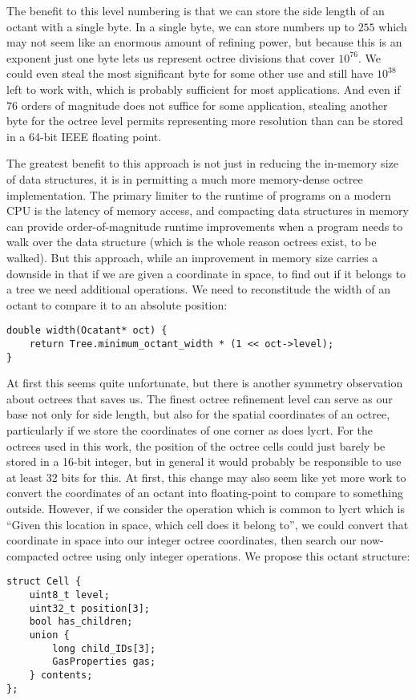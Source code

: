 The benefit to this level numbering is that we can store the side length of an octant with a single byte.
In a single byte, we can store numbers up to $255$ which may not seem like an enormous amount of refining power, but because this is an exponent just one byte lets us represent octree divisions that cover $10^{76}$.
We could even steal the most significant byte for some other use and still have $10^{38}$ left to work with, which is probably sufficient for most applications.
And even if $76$ orders of magnitude does not suffice for some application, stealing another byte for the octree level permits representing more resolution than can be stored in a 64-bit IEEE floating point.

The greatest benefit to this approach is not just in reducing the in-memory size of data structures, it is in permitting a much more memory-dense octree implementation.
The primary limiter to the runtime of programs on a modern CPU is the latency of memory access, and compacting data structures in memory can provide order-of-magnitude runtime improvements when a program needs to walk over the data structure (which is the whole reason octrees exist, to be walked).
But this approach, while an improvement in memory size carries a downside in that if we are given a coordinate in space, to find out if it belongs to a tree we need additional operations.
We need to reconstitude the width of an octant to compare it to an absolute position:
\begin{lstlisting}
double width(Ocatant* oct) {
    return Tree.minimum_octant_width * (1 << oct->level);
}
\end{lstlisting}

At first this seems quite unfortunate, but there is another symmetry observation about octrees that saves us.
The finest octree refinement level can serve as our base not only for side length, but also for the spatial coordinates of an octree, particularly if we store the coordinates of one corner as does {\sc lycrt}.
For the octrees used in this work, the position of the octree cells could just barely be stored in a 16-bit integer, but in general it would probably be responsible to use at least 32 bits for this.
At first, this change may also seem like yet more work to convert the coordinates of an octant into floating-point to compare to something outside.
However, if we consider the operation which is common to {\sc lycrt} which is ``Given this location in space, which cell does it belong to'', we could convert that coordinate in space into our integer octree coordinates, then search our now-compacted octree using only integer operations.
We propose this octant structure:
\begin{lstlisting}
struct Cell {
    uint8_t level;
    uint32_t position[3];
    bool has_children;
    union {
        long child_IDs[3];
        GasProperties gas;
    } contents;
};
\end{lstlisting}














